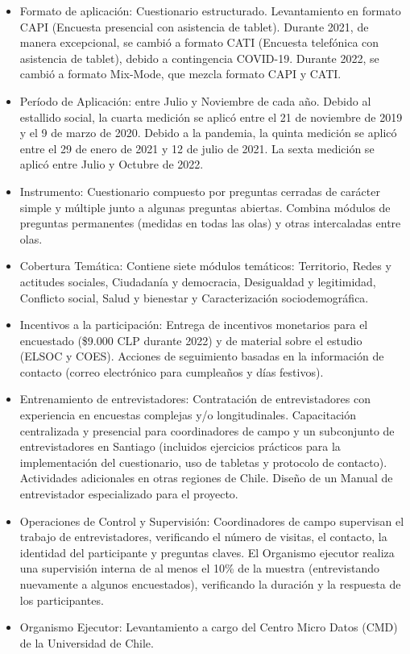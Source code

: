 \documentclass[
  12pt,
]{book}
\providecommand{\tightlist}{%
  \setlength{\itemsep}{0pt}\setlength{\parskip}{0pt}}
\begin{document}
\begin{itemize}
\tightlist
\item
  Formato de aplicación: Cuestionario estructurado. Levantamiento en formato CAPI (Encuesta presencial con asistencia de tablet). Durante 2021, de manera excepcional, se cambió a formato CATI (Encuesta telefónica con asistencia de tablet), debido a contingencia COVID-19. Durante 2022, se cambió a formato Mix-Mode, que mezcla formato CAPI y CATI.
\item
  Período de Aplicación: entre Julio y Noviembre de cada año. Debido al estallido social, la cuarta medición se aplicó entre el 21 de noviembre de 2019 y el 9 de marzo de 2020. Debido a la pandemia, la quinta medición se aplicó entre el 29 de enero de 2021 y 12 de julio de 2021. La sexta medición se aplicó entre Julio y Octubre de 2022.
\item
  Instrumento: Cuestionario compuesto por preguntas cerradas de carácter simple y múltiple junto a algunas preguntas abiertas. Combina módulos de preguntas permanentes (medidas en todas las olas) y otras intercaladas entre olas.
\item
  Cobertura Temática: Contiene siete módulos temáticos: Territorio, Redes y actitudes sociales, Ciudadanía y democracia, Desigualdad y legitimidad, Conflicto social, Salud y bienestar y Caracterización sociodemográfica.
\item
  Incentivos a la participación: Entrega de incentivos monetarios para el encuestado (\$9.000 CLP durante 2022) y de material sobre el estudio (ELSOC y COES). Acciones de seguimiento basadas en la información de contacto (correo electrónico para cumpleaños y días festivos).
\item
  Entrenamiento de entrevistadores: Contratación de entrevistadores con experiencia en encuestas complejas y/o longitudinales. Capacitación centralizada y presencial para coordinadores de campo y un subconjunto de entrevistadores en Santiago (incluidos ejercicios prácticos para la implementación del cuestionario, uso de tabletas y protocolo de contacto). Actividades adicionales en otras regiones de Chile. Diseño de un Manual de entrevistador especializado para el proyecto.
\item
  Operaciones de Control y Supervisión: Coordinadores de campo supervisan el trabajo de entrevistadores, verificando el número de visitas, el contacto, la identidad del participante y preguntas claves. El Organismo ejecutor realiza una supervisión interna de al menos el 10\% de la muestra (entrevistando nuevamente a algunos encuestados), verificando la duración y la respuesta de los participantes.
\item
  Organismo Ejecutor: Levantamiento a cargo del Centro Micro Datos (CMD) de la Universidad de Chile.
\end{itemize}
\end{document}
